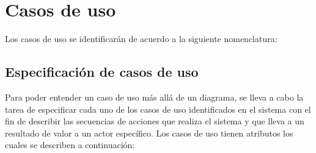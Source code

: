 \chapter{Casos de uso}

Los casos de uso se identificarán de acuerdo a la siguiente nomenclatura:




\section{Especificación de casos de uso}

Para poder entender un caso de uso más allá de un diagrama, se lleva a cabo la tarea de especificar cada uno de los casos de uso identificados en el sistema con el fin de describir las secuencias de acciones que realiza el sistema y que lleva a un resultado de valor a un actor específico. Los casos de uso tienen atributos los cuales se describen a continuación:

